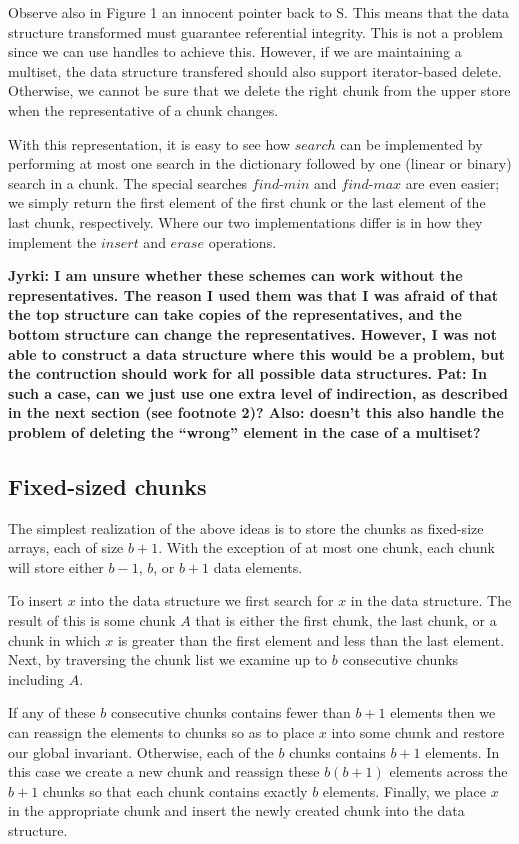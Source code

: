 \documentclass{DIKU-article}
\newcommand{\Findmin}{\mbox{$\mathit{find}$}\textnormal{-}\allowbreak{}\mbox{$\mathit{min}$}}
\newcommand{\Findmax}{\mbox{$\mathit{find}$}\textnormal{-}\allowbreak{}\mbox{$\mathit{max}$}}
\newcommand{\Insert}{\mbox{$\mathit{insert}$}}
\newcommand{\Erase}{\mbox{$\mathit{erase}$}}
\newcommand{\Search}{\mbox{$\mathit{search}$}}
\begin{document}
Observe also in Figure 1 an innocent pointer back to S. This means
that the data structure transformed must guarantee referential
integrity. This is not a problem since we can use handles to achieve
this. However, if we are maintaining a multiset, the data structure
transfered should also support iterator-based delete. Otherwise, we
cannot be sure that we delete the right chunk from the upper store
when the representative of a chunk changes.

With this representation, it is easy to see how \Search{} can be
implemented by performing at most one search in the dictionary
followed by one (linear or binary) search in a chunk.  The special
searches  \Findmin{} and \Findmax{} are even easier;  we simply return
the first element of the first chunk or the last element of the last
chunk, respectively.  Where our two implementations differ is in how
they implement the \Insert{} and \Erase{} operations.

\noindent\textbf{Jyrki: I am unsure whether these schemes can work
without the representatives. The reason I used them was that I was
afraid of that the top structure can take copies of the
representatives, and the bottom structure can change the
representatives. However, I was not able to construct a data structure
where this would be a problem, but the contruction should work for all
possible data structures. Pat: In such a case, can we just use one
extra level of indirection, as described in the next section (see
footnote 2)?  Also: doesn't this also handle the problem of deleting
the ``wrong'' element in the case of a multiset?}

\subsection{Fixed-sized chunks}

The simplest realization of the above ideas is to store the chunks as
fixed-size arrays, each of size $b+1$.  With the exception of at most
one chunk, each chunk will store either $b-1$, $b$, or $b+1$ data
elements.

To insert $x$ into the data structure we first search for $x$ in the
data structure.  The result of this is some chunk $A$ that is either
the first chunk, the last chunk, or a chunk in which $x$ is greater
than the first element and less than the last element.  Next, by
traversing the chunk list we examine up to $b$ consecutive chunks
including $A$.

If any of these $b$ consecutive chunks contains fewer than $b+1$
elements then we can reassign the elements to chunks so as to place
$x$ into some chunk and restore our global invariant.  Otherwise, each
of the $b$ chunks contains $b+1$ elements.  In this case we create a
new chunk and reassign these $b(b+1)$ elements across the $b+1$ chunks
so that each chunk contains exactly $b$ elements.  Finally, we place
$x$ in the appropriate chunk and insert the newly created chunk into
the data structure.
\end{document}
